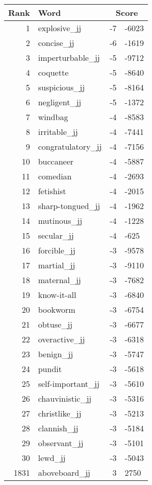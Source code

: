 \begin{longtable}[!htbp]{| rlr@{.}l |}
    \hline
    \textbf{Rank} & \textbf{Word} & \multicolumn{2}{c|}{\textbf{Score}} \\
    \hline
    \endhead
    1 & explosive\_jj & -7 & -6023 \\
    2 & concise\_jj & -6 & -1619 \\
    3 & imperturbable\_jj & -5 & -9712 \\
    4 & coquette & -5 & -8640 \\
    5 & suspicious\_jj & -5 & -8164 \\
    6 & negligent\_jj & -5 & -1372 \\
    7 & windbag & -4 & -8583 \\
    8 & irritable\_jj & -4 & -7441 \\
    9 & congratulatory\_jj & -4 & -7156 \\
    10 & buccaneer & -4 & -5887 \\
    11 & comedian & -4 & -2693 \\
    12 & fetishist & -4 & -2015 \\
    13 & sharp-tongued\_jj & -4 & -1962 \\
    14 & mutinous\_jj & -4 & -1228 \\
    15 & secular\_jj & -4 & -625 \\
    16 & forcible\_jj & -3 & -9578 \\
    17 & martial\_jj & -3 & -9110 \\
    18 & maternal\_jj & -3 & -7682 \\
    19 & know-it-all & -3 & -6840 \\
    20 & bookworm & -3 & -6754 \\
    21 & obtuse\_jj & -3 & -6677 \\
    22 & overactive\_jj & -3 & -6318 \\
    23 & benign\_jj & -3 & -5747 \\
    24 & pundit & -3 & -5618 \\
    25 & self-important\_jj & -3 & -5610 \\
    26 & chauvinistic\_jj & -3 & -5316 \\
    27 & christlike\_jj & -3 & -5213 \\
    28 & clannish\_jj & -3 & -5184 \\
    29 & observant\_jj & -3 & -5101 \\
    30 & lewd\_jj & -3 & -5043 \\
    1831 & aboveboard\_jj & 3 & 2750 \\

\end{longtable}

